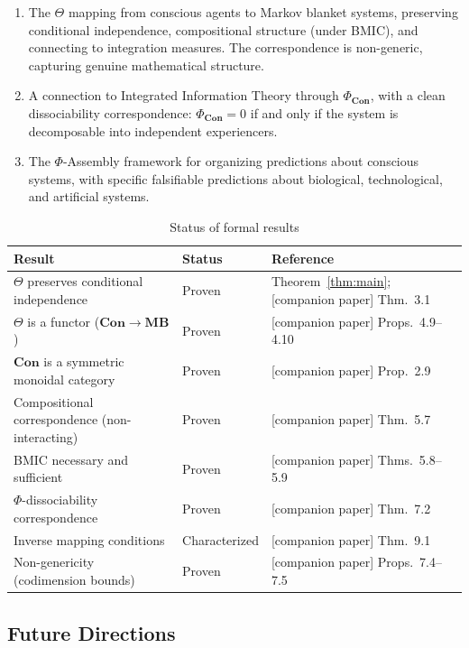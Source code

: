 \documentclass[11pt,a4paper]{article}
\theoremstyle{definition}
\theoremstyle{plain}
\theoremstyle{remark}
\newcommand{\Con}{\mathbf{Con}}
\newcommand{\MB}{\mathbf{MB}}
\begin{document}
\begin{enumerate}
    \item The $\Theta$ mapping from conscious agents to Markov blanket systems, preserving conditional independence, compositional structure (under BMIC), and connecting to integration measures. The correspondence is non-generic, capturing genuine mathematical structure.

    \item A connection to Integrated Information Theory through $\Phi_{\Con}$, with a clean dissociability correspondence: $\Phi_{\Con} = 0$ if and only if the system is decomposable into independent experiencers.

    \item The $\Phi$-Assembly framework for organizing predictions about conscious systems, with specific falsifiable predictions about biological, technological, and artificial systems.
\end{enumerate}

\begin{table}[h]
\centering
\begin{tabular}{lll}
\toprule
\textbf{Result} & \textbf{Status} & \textbf{Reference} \\
\midrule
$\Theta$ preserves conditional independence & Proven & Theorem~\ref{thm:main}; [companion paper] Thm.~3.1 \\
$\Theta$ is a functor ($\Con \to \MB$) & Proven & [companion paper] Props.~4.9--4.10 \\
$\Con$ is a symmetric monoidal category & Proven & [companion paper] Prop.~2.9 \\
Compositional correspondence (non-interacting) & Proven & [companion paper] Thm.~5.7 \\
BMIC necessary and sufficient & Proven & [companion paper] Thms.~5.8--5.9 \\
$\Phi$-dissociability correspondence & Proven & [companion paper] Thm.~7.2 \\
Inverse mapping conditions & Characterized & [companion paper] Thm.~9.1 \\
Non-genericity (codimension bounds) & Proven & [companion paper] Props.~7.4--7.5 \\
\bottomrule
\end{tabular}
\caption{Status of formal results}
\end{table}

\subsection{Future Directions}
\end{document}
